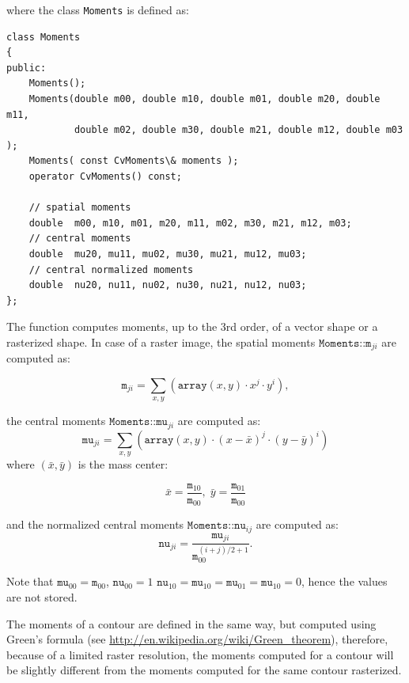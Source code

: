 
where the class \texttt{Moments} is defined as:
\begin{lstlisting}
class Moments
{
public:
    Moments();
    Moments(double m00, double m10, double m01, double m20, double m11,
            double m02, double m30, double m21, double m12, double m03 );
    Moments( const CvMoments\& moments );
    operator CvMoments() const;
    
    // spatial moments
    double  m00, m10, m01, m20, m11, m02, m30, m21, m12, m03;
    // central moments
    double  mu20, mu11, mu02, mu30, mu21, mu12, mu03;
    // central normalized moments
    double  nu20, nu11, nu02, nu30, nu21, nu12, nu03;
};
\end{lstlisting}

\begin{description}
\end{description}

The function computes moments, up to the 3rd order, of a vector shape or a rasterized shape.
In case of a raster image, the spatial moments $\texttt{Moments::m}_{ji}$ are computed as:

\[\texttt{m}_{ji}=\sum_{x,y} \left(\texttt{array}(x,y) \cdot x^j \cdot y^i\right),\]

the central moments $\texttt{Moments::mu}_{ji}$ are computed as:
\[\texttt{mu}_{ji}=\sum_{x,y} \left(\texttt{array}(x,y) \cdot (x - \bar{x})^j \cdot (y - \bar{y})^i\right)\]
where $(\bar{x}, \bar{y})$ is the mass center:

\[
\bar{x}=\frac{\texttt{m}_{10}}{\texttt{m}_{00}},\; \bar{y}=\frac{\texttt{m}_{01}}{\texttt{m}_{00}}
\]

and the normalized central moments $\texttt{Moments::nu}_{ij}$ are computed as:
\[\texttt{nu}_{ji}=\frac{\texttt{mu}_{ji}}{\texttt{m}_{00}^{(i+j)/2+1}}.\]

Note that $\texttt{mu}_{00}=\texttt{m}_{00}$, $\texttt{nu}_{00}=1$ $\texttt{nu}_{10}=\texttt{mu}_{10}=\texttt{mu}_{01}=\texttt{mu}_{10}=0$, hence the values are not stored.

The moments of a contour are defined in the same way, but computed using Green's formula
(see \url{http://en.wikipedia.org/wiki/Green_theorem}), therefore, because of a limited raster resolution, the moments computed for a contour will be slightly different from the moments computed for the same contour rasterized.

